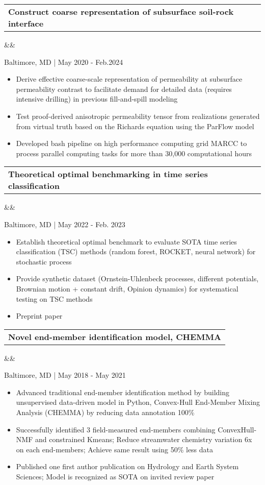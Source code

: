 \documentclass[12pt,letterpaper,sans]{moderncv}        %
\makeatletter
\newcommand*{\customcvproject}[4][.25em]{
  \begin{tabular}{@{}l} 
    {\bfseries #2} { #3}
  \end{tabular}


      

  \ifx&#4&%
  \else{\\%
    \begin{minipage}{\maincolumnwidth}%
      \small#4%
    \end{minipage}}\fi%
  \par\addvspace{#1}}
\makeatother
\begin{document}
{\begin{itemize}
\end{itemize}

 
{\customcvproject{Construct coarse representation of subsurface soil-rock interface}{}
{}}
Baltimore, MD | May 2020 - Feb.2024
\begin{itemize}
  \item Derive effective coarse-scale representation of permeability at subsurface permeability contrast to facilitate demand for detailed data (requires intensive drilling) in previous fill-and-spill modeling
    \item Test proof-derived anisotropic permeability tensor from realizations generated from virtual truth based on the Richards equation using the ParFlow model
    \item Developed bash pipeline on high performance computing grid MARCC to process parallel computing tasks for more than 30,000 computational hours
 \end{itemize}

{\customcvproject{Theoretical optimal benchmarking in time series classiﬁcation}{}{}}
Baltimore, MD | May 2022  - Feb. 2023
\begin{itemize}
\item Establish theoretical optimal benchmark to evaluate SOTA time series classification (TSC) methods (random forest, ROCKET, neural network) for stochastic process
\item Provide synthetic dataset (Ornstein-Uhlenbeck processes, different potentials, Brownian motion + constant drift, Opinion dynamics) for systematical testing on TSC methods
\item Preprint paper \cite{zhang2023benchmarking}
 \end{itemize}

{\customcvproject{Novel end-member identification model, CHEMMA}{}
{}
}
Baltimore, MD | May 2018 - May 2021
\begin{itemize}
\item Advanced traditional end-member identification method by building unsupervised data-driven model in Python, Convex-Hull End-Member Mixing Analysis (CHEMMA) by reducing data annotation 100\%
\item Successfully identified 3 field-measured end-members combining ConvexHull-NMF and constrained Kmeans; Reduce streamwater chemistry variation 6x on each end-members; Achieve same result using 50\% less data
\item Published one first author publication \cite{xufei} on Hydrology and Earth System Sciences; Model is recognized as SOTA on invited review paper 


\end{itemize}}
\end{document}
